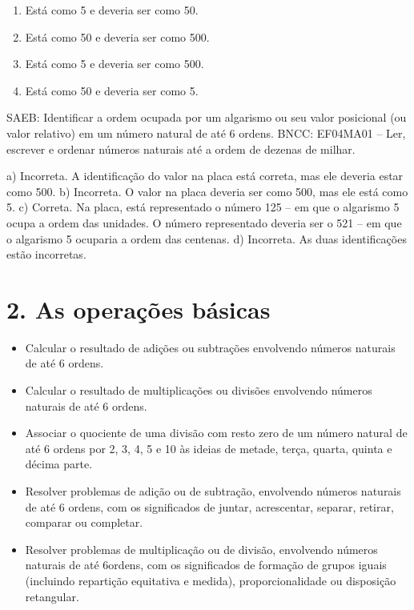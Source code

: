 \begin{enumerate}
\begin{enumerate}
\def\labelenumi{\alph{enumi})}
\item
  Está como 5 e deveria ser como 50.
\item
  Está como 50 e deveria ser como 500.
\item
  Está como 5 e deveria ser como 500.
\item
  Está como 50 e deveria ser como 5.
\end{enumerate}

SAEB: Identificar a ordem ocupada por um algarismo ou seu valor posicional (ou valor relativo) em um número natural de até 6 ordens.
BNCC: EF04MA01 -- Ler, escrever e ordenar números naturais até a ordem de dezenas de milhar.

a)  Incorreta. A identificação do valor na placa está correta, mas ele deveria estar como 500.
b)  Incorreta. O valor na placa deveria ser como 500, mas ele está como 5.
c)  Correta. Na placa, está representado o número 125 -- em que o algarismo 5 ocupa a ordem das unidades. O número representado deveria ser o 521 -- em que o algarismo 5 ocuparia a ordem das centenas.
d)  Incorreta. As duas identificações estão incorretas.


\section{2. As operações básicas}\label{muxf3dulo-2}


\begin{itemize}
\item Calcular o resultado de adições ou subtrações envolvendo números
naturais de até 6 ordens.
\item Calcular o resultado de multiplicações ou divisões envolvendo números
naturais de até 6 ordens.
\item Associar o quociente de uma divisão com resto zero de um número
natural de até 6 ordens por 2, 3, 4, 5 e 10 às ideias de metade, terça,
quarta, quinta e décima parte.
\item Resolver problemas de adição ou de subtração, envolvendo números
naturais de até 6 ordens, com os significados de juntar, acrescentar,
separar, retirar, comparar ou completar.
\item Resolver problemas de multiplicação ou de divisão, envolvendo números
naturais de até 6ordens, com os significados de formação de grupos
iguais (incluindo repartição equitativa e medida), proporcionalidade ou
disposição retangular.
\end{itemize}


\end{enumerate}

